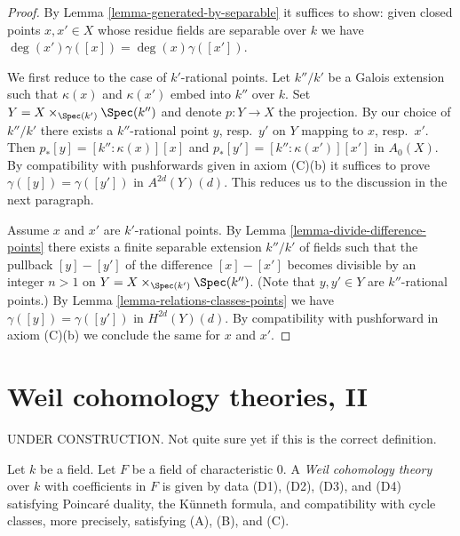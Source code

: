 \begin{proof}
By Lemma \ref{lemma-generated-by-separable} it suffices to show: given
closed points $x, x' \in X$ whose residue fields are separable over $k$
we have $\deg(x') \gamma([x]) = \deg(x) \gamma([x'])$.

\medskip\noindent
We first reduce to the case of $k'$-rational points. Let $k''/k'$ be a
Galois extension such that $\kappa(x)$ and $\kappa(x')$ embed into $k''$
over $k$. Set $Y = X \times_{\Spec(k')} \Spec(k'')$ and denote $p : Y \to X$
the projection. By our choice of $k''/k'$ there exists a
$k''$-rational point $y$, resp.\ $y'$ on $Y$ mapping to $x$, resp.\ $x'$.
Then $p_*[y] = [k'' : \kappa(x)][x]$ and
$p_*[y'] = [k'' : \kappa(x')][x']$ in $A_0(X)$.
By compatibility with pushforwards given in axiom (C)(b)
it suffices to prove $\gamma([y]) = \gamma([y'])$ in $A^{2d}(Y)(d)$.
This reduces us to the discussion in the next paragraph.

\medskip\noindent
Assume $x$ and $x'$ are $k'$-rational points. By
Lemma \ref{lemma-divide-difference-points} there
exists a finite separable extension $k''/k'$ of fields
such that the pullback $[y] - [y']$
of the difference $[x] - [x']$ becomes divisible
by an integer $n > 1$ on $Y = X \times_{\Spec(k')} \Spec(k'')$.
(Note that $y, y' \in Y$ are $k''$-rational points.)
By Lemma \ref{lemma-relations-classes-points} we have
$\gamma([y]) = \gamma([y'])$ in $H^{2d}(Y)(d)$.
By compatibility with pushforward in axiom (C)(b)
we conclude the same for $x$ and $x'$.
\end{proof}























\section{Weil cohomology theories, II}
\label{section-old}

\noindent
UNDER CONSTRUCTION. Not quite sure yet if this is the correct
definition.

\begin{definition}
\label{definition-weil-cohomology-theory}
Let $k$ be a field. Let $F$ be a field of characteristic $0$.
A {\it Weil cohomology theory} over $k$ with coefficients in $F$
is given by data (D1), (D2), (D3), and (D4) satisfying
Poincar\'e duality, the K\"unneth formula, and compatibility
with cycle classes, more precisely, satisfying (A), (B), and (C).
\end{definition}

